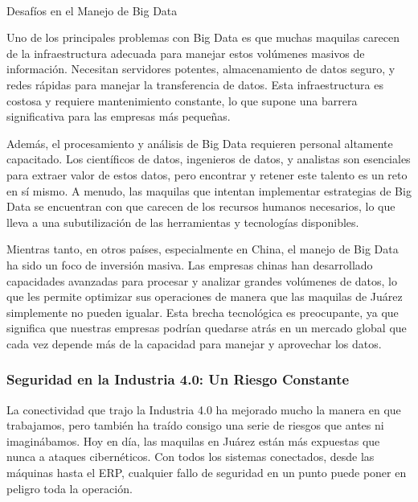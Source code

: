 \documentclass[
  letterpaper,
]{book}
\makeatletter
\let\oldparagraph\paragraph
\renewcommand{\paragraph}{
    \@ifstar
      \xxxParagraphStar
      \xxxParagraphNoStar
  }
\newcommand{\xxxParagraphStar}[1]{\oldparagraph*{#1}\mbox{}}
\newcommand{\xxxParagraphNoStar}[1]{\oldparagraph{#1}\mbox{}}
\makeatother
\begin{document}
\paragraph{Desafíos en el Manejo de Big
Data}\label{desafuxedos-en-el-manejo-de-big-data}

Uno de los principales problemas con Big Data es que muchas maquilas
carecen de la infraestructura adecuada para manejar estos volúmenes
masivos de información. Necesitan servidores potentes, almacenamiento de
datos seguro, y redes rápidas para manejar la transferencia de datos.
Esta infraestructura es costosa y requiere mantenimiento constante, lo
que supone una barrera significativa para las empresas más pequeñas.

Además, el procesamiento y análisis de Big Data requieren personal
altamente capacitado. Los científicos de datos, ingenieros de datos, y
analistas son esenciales para extraer valor de estos datos, pero
encontrar y retener este talento es un reto en sí mismo. A menudo, las
maquilas que intentan implementar estrategias de Big Data se encuentran
con que carecen de los recursos humanos necesarios, lo que lleva a una
subutilización de las herramientas y tecnologías disponibles.

Mientras tanto, en otros países, especialmente en China, el manejo de
Big Data ha sido un foco de inversión masiva. Las empresas chinas han
desarrollado capacidades avanzadas para procesar y analizar grandes
volúmenes de datos, lo que les permite optimizar sus operaciones de
manera que las maquilas de Juárez simplemente no pueden igualar. Esta
brecha tecnológica es preocupante, ya que significa que nuestras
empresas podrían quedarse atrás en un mercado global que cada vez
depende más de la capacidad para manejar y aprovechar los datos.

\subsubsection{Seguridad en la Industria 4.0: Un Riesgo
Constante}\label{seguridad-en-la-industria-4.0-un-riesgo-constante}

La conectividad que trajo la Industria 4.0 ha mejorado mucho la manera
en que trabajamos, pero también ha traído consigo una serie de riesgos
que antes ni imaginábamos. Hoy en día, las maquilas en Juárez están más
expuestas que nunca a ataques cibernéticos. Con todos los sistemas
conectados, desde las máquinas hasta el ERP, cualquier fallo de
seguridad en un punto puede poner en peligro toda la operación.
\end{document}

